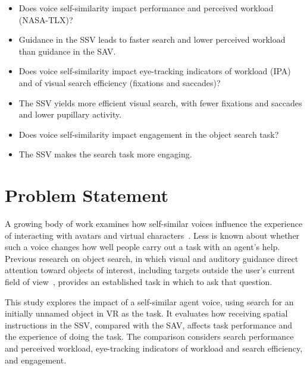 \begin{itemize}[leftmargin=3.9em,labelwidth=3.5em,labelsep=0.4em,align=left]
\item[\textbf{RQ1:}] Does voice self-similarity impact performance and perceived workload (NASA-TLX)?
\item[\textbf{H1:}] Guidance in the SSV leads to faster search and lower perceived workload than guidance in the SAV.
\item[\textbf{RQ2:}] Does voice self-similarity impact eye-tracking indicators of workload (IPA) and of visual search efficiency (fixations and saccades)?
\item[\textbf{H2:}] The SSV yields more efficient visual search, with fewer fixations and saccades and lower pupillary activity.
\item[\textbf{RQ3:}] Does voice self-similarity impact engagement in the object search task?
\item[\textbf{H3:}] The SSV makes the search task more engaging.
\end{itemize}

\section{Problem Statement}
A growing body of work examines how self-similar voices influence the experience of interacting with avatars and virtual characters~\cite{guo2024doppelganger,kao2021selfsimilar}. Less is known about whether such a voice changes how well people carry out a task with an agent's help. Previous research on object search, in which visual and auditory guidance direct attention toward objects of interest, including targets outside the user's current field of view~\cite{grogorick2017subtle,lange2020hivefive,gruenefeld2017eyesee360,marquardt2020guidance,binetti2021outofview,zhang2023seehear}, provides an established task in which to ask that question.

This study explores the impact of a self-similar agent voice, using search for an initially unnamed object in VR as the task. It evaluates how receiving spatial instructions in the SSV, compared with the SAV, affects task performance and the experience of doing the task. The comparison considers search performance and perceived workload, eye-tracking indicators of workload and search efficiency, and engagement.

